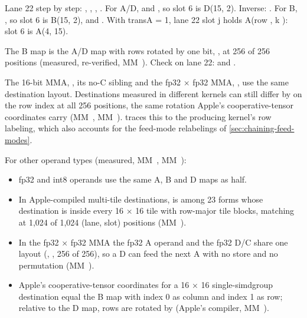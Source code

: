 Lane 22 step by step: , , , . For A/D, 
and , so slot 6 is D(15, 2). Inverse: . For B, , so slot 6 is B(15, 2), and . With transA = 1, lane 22 slot j holds A(row , k ): slot 6 is
A(4, 15).

The B map is the A/D map with rows rotated by one bit, , at 256 of 256
positions (measured, re-verified, MM~). Check on lane 22:  and .

The 16-bit MMA, , its no-C sibling and the fp32 × fp32 MMA, , use the same destination layout.
Destinations measured in different kernels can still differ by  on the row index at all 256 positions, the
same rotation Apple's cooperative-tensor coordinates carry (MM~, MM~). 
traces this to the producing kernel's row labeling, which also accounts for the feed-mode relabelings of
\cref{sec:chaining-feed-modes}.

For other operand types (measured, MM~, MM~):

\begin{itemize}
\item fp32 and int8 operands use the same A, B and D maps as half.
\item In Apple-compiled multi-tile destinations,  is among 23 forms whose destination is  inside
  every 16 × 16 tile with row-major tile blocks, matching at 1,024 of 1,024 (lane, slot) positions (MM~).
\item In the fp32 × fp32 MMA the fp32 A operand and the fp32 D/C share one layout (, , 256 of 256), so a D
  can feed the next A with no store and no permutation (MM~).
\item Apple's cooperative-tensor coordinates for a 16 × 16 single-simdgroup destination equal the B map with index 0 as
  column and index 1 as row; relative to the D map, rows are rotated by  (Apple's compiler,
  MM~).
\end{itemize}

